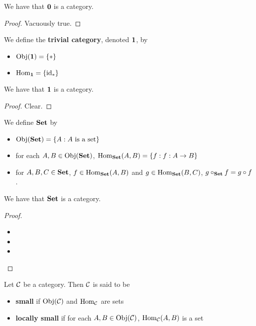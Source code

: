 \documentclass{book}
\begin{document}
	\begin{ex} 
		We have that $\0$ is a category.
	\end{ex}
	
	\begin{proof}
		Vacuously true.
	\end{proof}

	\begin{defn} 
		We define the \textbf{trivial category}, denoted $\1$, by 
		\begin{itemize}
			\item $\Obj(\1) = \{*\}$
			\item $\Hom_{\1} = \{\id_*\}$
		\end{itemize}
	\end{defn}

	\begin{ex} 
		We have that $\1$ is a category.
	\end{ex}

	\begin{proof}
		Clear.
	\end{proof}
	
	\begin{defn} 
		We define $\Set$ by  
		\begin{itemize}
			\item $\Obj(\Set) = \{A: A \text{ is a set}\}$ 
			\item for each $A,B \in \Obj(\Set)$, $\Hom_{\Set}(A,B) = \{f: f:A \rightarrow B\}$
			\item for $A, B, C \in \Set$, $f \in \Hom_{\Set}(A, B)$ and $g \in \Hom_{\Set}(B, C)$, $g \circ_{\Set} f = g \circ f$. 
		\end{itemize}
	\end{defn}

	\begin{ex} 
		We have that $\Set$ is a category.
	\end{ex}

	\begin{proof}\
		\begin{itemize}
			\item {}
			\item {} 
			\item {} 
		\end{itemize}
	\end{proof}
	
	\begin{defn} 
		Let $\MC$ be a category. Then $\MC$ is said to be 
		\begin{itemize}
			\item \textbf{small} if $\Obj(\MC)$ and $\Hom_{\MC}$ are sets
			\item \textbf{locally small} if for each $A,B \in \Obj(\MC)$, $\Hom_{\MC}(A,B)$ is a set 
		\end{itemize}
	\end{defn}
\end{document}

